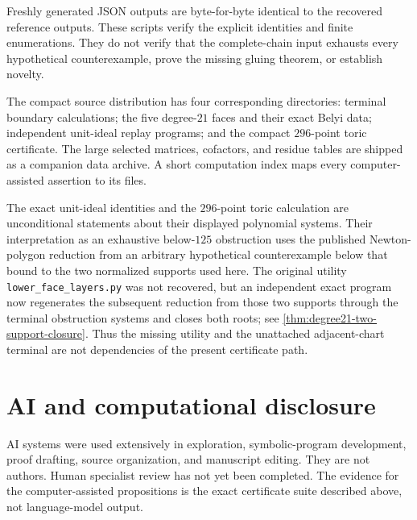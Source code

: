 \documentclass[11pt,reqno]{amsart}
\begin{document}
Freshly generated JSON outputs are byte-for-byte identical to the recovered
reference outputs.  These scripts verify the explicit identities and finite
enumerations.  They do not verify that the complete-chain input exhausts
every hypothetical counterexample, prove the missing gluing theorem, or
establish novelty.

The compact source distribution has four corresponding directories: terminal
boundary calculations; the five degree-\(21\) faces and their exact Belyi
data; independent unit-ideal replay programs; and the compact \(296\)-point
toric certificate.  The large selected matrices, cofactors, and residue
tables are shipped as a companion data archive.  A short computation index
maps every computer-assisted assertion to its files.

The exact unit-ideal identities and the \(296\)-point toric calculation are
unconditional statements about their displayed polynomial systems.  Their
interpretation as an exhaustive below-\(125\) obstruction uses the published
Newton-polygon reduction from an arbitrary hypothetical counterexample below
that bound to the two normalized supports used here.
The original utility \texttt{lower\_face\_layers.py} was not recovered, but
an independent exact program now regenerates the subsequent reduction from
those two supports through the terminal obstruction systems and closes both
roots; see \cref{thm:degree21-two-support-closure}.  Thus the missing utility
and the unattached adjacent-chart terminal are not dependencies of the
present certificate path.

\appendix





\section*{AI and computational disclosure}

AI systems were used extensively in exploration, symbolic-program
development, proof drafting, source organization, and manuscript editing.
They are not authors.  Human specialist review has not yet been completed.
The evidence for the computer-assisted propositions is the exact certificate
suite described above, not language-model output.



\end{document}
